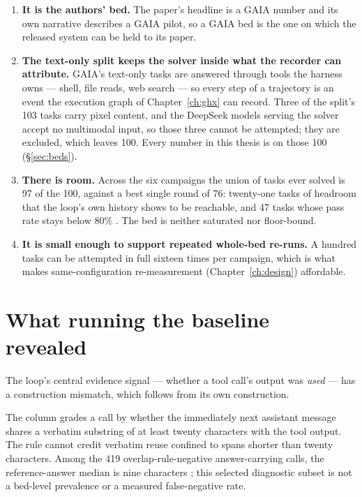 \begin{enumerate}
  \item \textbf{It is the authors' bed.} The paper's headline is a GAIA
        number and its own narrative describes a GAIA pilot, so a GAIA bed
        is the one on which the released system can be held to its
        paper.
  \item \textbf{The text-only split keeps the solver inside what the
        recorder can attribute.} GAIA's text-only tasks are answered
        through tools the harness owns --- shell, file reads, web search
        --- so every step of a trajectory is an event the execution graph
        of Chapter~\ref{ch:ghx} can record. Three of the split's 103 tasks
        carry pixel content, and the DeepSeek models serving the solver
        accept no multimodal input, so those three cannot be attempted;
        they are excluded, which leaves 100. Every number in this thesis
        is on those 100 (\S\ref{sec:beds}).
  \item \textbf{There is room.} Across the six campaigns the union of
        tasks ever solved is 97 of the 100, against a best single round of
        76: twenty-one tasks of headroom that the loop's own history shows
        to be reachable, and 47 tasks whose pass rate stays below $80\%$
        . The bed is neither saturated nor floor-bound.
  \item \textbf{It is small enough to support repeated whole-bed re-runs.} A
        hundred tasks can be attempted in full sixteen times per campaign,
        which is what makes same-configuration re-measurement
        (Chapter~\ref{ch:design}) affordable.
\end{enumerate}

\section{What running the baseline revealed}
\label{sec:baseline-revealed}

The loop's central evidence signal --- whether a tool call's output was
\emph{used} --- has a construction mismatch, which follows from its
own construction.

The column grades a call by whether the immediately next assistant message
shares a verbatim substring of at least twenty characters with the tool
output. The rule cannot credit verbatim reuse confined to spans shorter than
twenty characters. Among the 419 overlap-rule-negative answer-carrying calls,
the reference-answer median is nine characters ; this selected diagnostic
subset is not a bed-level prevalence or a measured false-negative rate.

